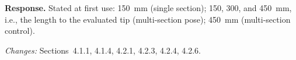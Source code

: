 \textbf{Response.} Stated at first use: 150~mm (single section); 150, 300, and 450~mm, i.e., the length to the evaluated tip (multi-section pose); 450~mm (multi-section control).

\textit{Changes:} Sections~4.1.1, 4.1.4, 4.2.1, 4.2.3, 4.2.4, 4.2.6.
